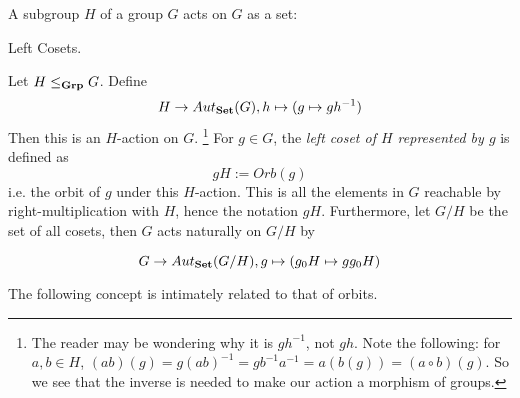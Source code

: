 \documentclass[../book.tex]{subfiles}
\begin{document}


A subgroup $H$ of a group $G$ acts on $G$ as a set: 

\begin{dfn} Left Cosets. 

    Let $H \leq_{\mathbf{Grp}} G$. 
    Define 
    \[H \to Aut_{\mathbf{Set}}(G), h \mapsto (g \mapsto gh^{-1})\]
    Then this is an $H$-action on $G$. \footnote{
        The reader may be wondering why it is $gh^{-1}$, not $gh$.
        Note the following: for $a, b \in H$, 
        $(ab)(g) = g(ab)^{-1} = gb^{-1}a^{-1} = a(b(g)) = (a \circ b)(g)$.
        So we see that the inverse is needed to make our action a morphism of groups.
    }
    For $g \in G$, 
    the \emph{left coset of $H$ represented by $g$} is defined as
    \[gH := Orb(g)\]
    i.e. the orbit of $g$ under this $H$-action. 
    This is all the elements in $G$ reachable by 
    right-multiplication with $H$, hence the notation $gH$. 
    Furthermore, let $G / H$ be the set of all cosets, 
    then $G$ acts naturally on $G / H$ by
    
    \[G \to Aut_{\mathbf{Set}}(G / H), g \mapsto (g_0H \mapsto gg_0H)\]
\end{dfn}

The following concept is intimately related to that of orbits. 
\end{document}

